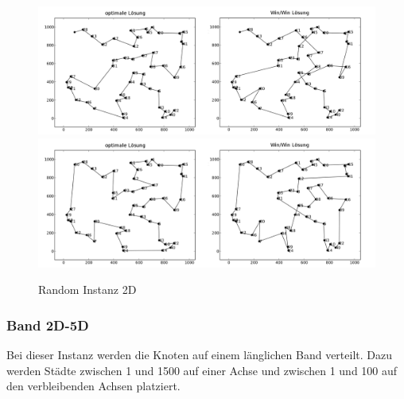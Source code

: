 \documentclass[11pt,a4paper]{article}
\begin{document}
\begin{figure}[H]
    \centering
    \includegraphics[width=15cm]{gfx/random_hpp_comparison}
    \includegraphics[width=15cm]{gfx/random_tsp_comparison}
    \caption{Random Instanz 2D}
    \label{img:random_comparison}
\end{figure}

\subsubsection{Band 2D-5D}
Bei dieser Instanz werden die Knoten auf einem länglichen Band verteilt. Dazu werden Städte zwischen 1 und 1500 auf einer Achse und zwischen 1 und 100 auf den verbleibenden Achsen platziert.
\end{document}
